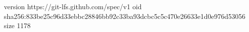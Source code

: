 version https://git-lfs.github.com/spec/v1
oid sha256:833be25c96d33ebbc28846bb92c33ba93dcbc5c5c470e26633e1d0e976d53056
size 1178
